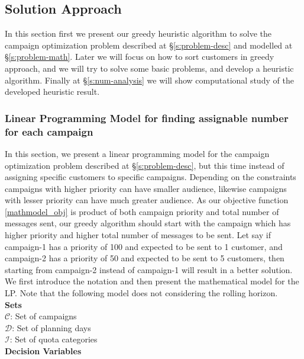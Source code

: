 \documentclass[11pt]{article}
\begin{document}
\subsection{Solution Approach}
In this section first we present our greedy heuristic algorithm to solve the campaign optimization problem  described at \S \ref{s:problem-desc} and modelled at \S \ref{s:problem-math}. Later we will focus on how to sort customers in greedy approach, and we will try to solve some basic problems, and develop a heuristic algorithm. Finally at \S \ref{s:num-analysis} we will show computational study of the developed heuristic  result.

\subsubsection{Linear Programming Model for finding assignable number for each campaign} \label{s:problem-math-lp}

In this section, we present a linear programming model for the campaign optimization problem described at \S \ref{s:problem-desc}, but this time instead of assigning specific customers to specific campaigns. Depending on the constraints campaigns with higher priority can have smaller audience, likewise campaigns with lesser priority can have much greater audience. As our objective function \eqref{mathmodel_obj} is product of both campaign priority and total number of messages sent, our greedy algorithm should start with the campaign which has higher priority and higher total number of messages to be sent. Let say if campaign-1 has a priority of 100 and expected to be sent to 1 customer, and campaign-2 has a priority of 50 and expected to be sent to 5 customers, then starting from campaign-2 instead of campaign-1 will result in a better solution.
\\
We first introduce the notation and then present the mathematical model for the LP. Note that the following model does not considering the rolling horizon.\\

\noindent \textbf{Sets}\\

\noindent ${\mathcal{C}}$: Set of campaigns \\
\noindent ${\mathcal{D}}$: Set of planning days \\
\noindent ${\mathcal{I}}$: Set of quota categories \\

\noindent \textbf{Decision Variables}\\
\end{document}
